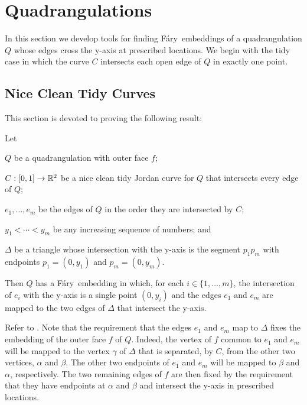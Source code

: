 \documentclass{patmorin}
\newcommand{\Fary}{Fáry}
\begin{document}
\section{Quadrangulations}

In this section we develop tools for finding \Fary\ embeddings of
a quadrangulation $Q$ whose edges cross the y-axis at prescribed
locations. We begin with the tidy case in which the curve $C$ intersects each
open edge of $Q$ in exactly one point.

\subsection{Nice Clean Tidy Curves}

This section is devoted to proving the following result:

\begin{thm}
    Let
    \begin{compactitem}
    \item $Q$ be a quadrangulation with outer face $f$; 
    \item $C:[0,1]\to\mathbb{R}^2$ be a nice clean tidy Jordan curve for $Q$
     that intersects every edge of $Q$;
    \item $e_1,\ldots,e_m$ be the edges of $Q$ in the
    order they are intersected by $C$; 
    \item $y_1<\cdots<y_m$
    be any increasing sequence of numbers; and
    \item $\Delta$ be a triangle whose intersection with the y-axis
     is the segment $p_1p_m$ with endpoints $p_1=(0,y_1)$ and $p_m=(0,y_m)$.
    \end{compactitem}
    Then $Q$ has a \Fary\ embedding in which, for each
    $i\in\{1,\ldots,m\}$, the intersection of $e_i$ with the y-axis is
    a single point $(0,y_i)$ and the edges $e_1$ and $e_m$ are mapped
    to the two edges of $\Delta$ that intersect the y-axis.
\end{thm}

Refer to .
Note that the requirement that the edges $e_1$ and $e_m$ map to $\Delta$
fixes the embedding of the outer face $f$ of $Q$. Indeed, the vertex of
$f$ common to $e_1$ and $e_m$ will be mapped to the vertex $\gamma$ of
$\Delta$ that is separated, by $C$, from the other two vertices, $\alpha$
and $\beta$.  The other two endpoints of $e_1$ and $e_m$ will be mapped
to $\beta$ and $\alpha$, respectively.  The two remaining edges of $f$
are then fixed by the requirement that they have endpoints at $\alpha$
and $\beta$ and intersect the y-axis in prescribed locations.
\end{document}
